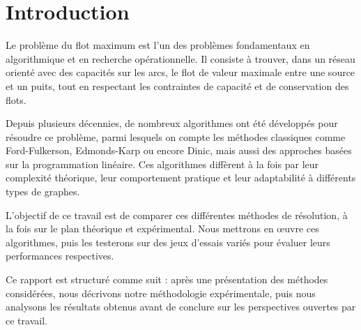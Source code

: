 \documentclass[a4paper]{article}
\begin{document}
\section{Introduction}
Le problème du flot maximum est l’un des problèmes fondamentaux en algorithmique et en recherche opérationnelle. Il consiste à trouver, dans un réseau orienté avec des capacités sur les arcs, le flot de valeur maximale entre une source et un puits, tout en respectant les contraintes de capacité et de conservation des flots.

Depuis plusieurs décennies, de nombreux algorithmes ont été développés pour résoudre ce problème, parmi lesquels on compte les méthodes classiques comme Ford-Fulkerson, Edmonds-Karp ou encore Dinic, mais aussi des approches basées sur la programmation linéaire. Ces algorithmes diffèrent à la fois par leur complexité théorique, leur comportement pratique et leur adaptabilité à différents types de graphes.

L’objectif de ce travail est de comparer ces différentes méthodes de résolution, à la fois sur le plan théorique et expérimental. Nous mettrons en \oe uvre ces algorithmes, puis les testerons sur des jeux d’essais variés pour évaluer leurs performances respectives.

Ce rapport est structuré comme suit : après une présentation des méthodes considérées, nous décrivons notre méthodologie expérimentale, puis nous analysons les résultats obtenus avant de conclure sur les perspectives ouvertes par ce travail.
\end{document}
